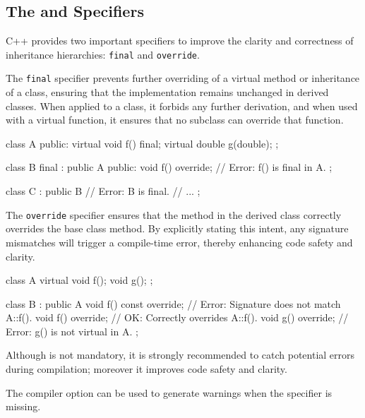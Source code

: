 \subsection{The  and  Specifiers}

C++ provides two important specifiers to improve the clarity and correctness of inheritance hierarchies: \texttt{final} and \texttt{override}.

\vspace{1em}

The \texttt{final} specifier prevents further overriding of a virtual method or inheritance of a class, ensuring that the implementation remains unchanged in derived classes. When applied to a class, it forbids any further derivation, and when used with a virtual function, it ensures that no subclass can override that function.

\begin{codeblock}[language=C++]
class A {
public:
    virtual void f() final;
    virtual double g(double);
};

class B final : public A {
public:
    void f() override; // Error: f() is final in A.
};

class C : public B // Error: B is final.
{
// ...
};
\end{codeblock}

The \texttt{override} specifier ensures that the method in the derived class correctly overrides the base class method. By explicitly stating this intent, any signature mismatches will trigger a compile-time error, thereby enhancing code safety and clarity.

\begin{codeblock}[language=C++]
class A {
    virtual void f();
    void g();
};

class B : public A {
    void f() const override; // Error: Signature does not match A::f().
    void f() override; // OK: Correctly overrides A::f().
    void g() override; // Error: g() is not virtual in A.
};
\end{codeblock}

\begin{tipsblock}
Although  is not mandatory, it is strongly recommended to catch potential errors during compilation; moreover it improves code safety and clarity.

The compiler option  can be used to generate warnings when the  specifier is missing.
\end{tipsblock}

